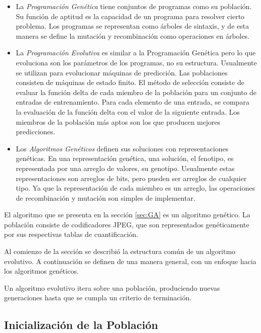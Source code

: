 \begin{itemize}
   \item La \emph{Programación Genética} \cite{GenProg} tiene conjuntos de
      programas como su población. Su función de aptitud es la capacidad de un
      programa para resolver cierto problema. Los programas se representan como
      árboles de sintaxis, y de esta manera se define la mutación y recombinación como
      operaciones en árboles.
   \item La \emph{Programación Evolutiva} es similar a la Programación Genética
      pero lo que evoluciona son los parámetros de los programas, no su
      estructura. Usualmente se utilizan para evolucionar máquinas de
      predicción. Las poblaciones consisten de máquinas de estado finito. El
      método de selección consiste de evaluar la función delta de cada miembro
      de la población para un conjunto de entradas de entrenamiento. Para cada
      elemento de una entrada, se compara la evaluación de la función delta con
      el valor de la siguiente entrada. Los miembros de la población más aptos son
      los que producen mejores predicciones.
   \item Los \emph{Algoritmos Genéticos} definen sus soluciones con
      representaciones genéticas. En una representación genética, una solución,
      el fenotipo, es representada por una arreglo de valores, su genotipo.
      Usualmente estas representaciones son arreglos de bits, pero pueden ser
      arreglos de cualquier tipo. Ya que la representación de cada miembro es
      un arreglo, las operaciones de recombinación y mutación son simples de
      implementar.
\end{itemize}

El algoritmo que se presenta en la sección \ref{sec:GA} es un algoritmo
genético. La población consiste de codificadores JPEG, que son representados
genéticamente por sus respectivas tablas de cuantificación.

Al comienzo de la sección se describió la estructura común de un algoritmo
evolutivo. A continuación se definen de una manera general, con un enfoque hacia
los algoritmos genéticos.

Un algoritmo evolutivo itera sobre una población, produciendo nuevas
generaciones hasta que se cumpla un criterio de terminación.

\subsection { Inicialización de la Población }

